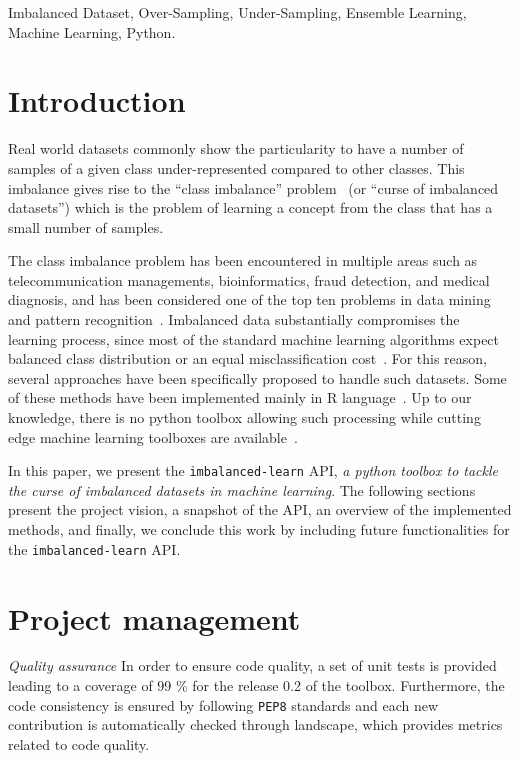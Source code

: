 \documentclass[twoside,11pt]{article}
\begin{document}
\begin{keywords}
  Imbalanced Dataset, Over-Sampling, Under-Sampling, Ensemble Learning, Machine Learning, Python.
\end{keywords}

\section{Introduction}

Real world datasets commonly show the particularity to have a number of samples of a given class under-represented compared to other classes.
This imbalance gives rise to the ``class imbalance'' problem~\citep{prati2009data} (or ``curse of imbalanced datasets'')
which is the problem of learning a concept from the class that has a small number of samples.

The class imbalance problem has been encountered in multiple areas such as
telecommunication managements, bioinformatics, fraud detection, and medical diagnosis,
and has been considered one of the top ten problems in data mining and
pattern recognition~\citep{yang200610,rastgoo2016tackling}.
Imbalanced data substantially compromises the learning process, since most of the
standard machine learning algorithms expect balanced class distribution or an
equal misclassification cost~\citep{he2009learning}. For this reason, several
approaches have been specifically proposed to handle such datasets.
Some of these methods have been implemented mainly in R language~\citep{torgo2010data,kuhn2015caret,dal2013racing}.
Up to our knowledge, there is no python toolbox allowing such processing while cutting edge machine learning toolboxes are available~\citep{pedregosa2011scikit,sonnenburg2010shogun}.

In this paper, we present the \texttt{imbalanced-learn} API,
\textit{a python toolbox to tackle the curse of imbalanced datasets
  in machine learning}. The following sections present the project vision, a snapshot of the API, an overview of the implemented methods,
and finally, we conclude this work by including future functionalities
for the \texttt{imbalanced-learn} API.

\section{Project management}

\noindent\textit{Quality assurance} In order to ensure code quality, a set of unit tests is provided leading to a coverage of 99 \% for the release 0.2 of the toolbox.
Furthermore, the code consistency is ensured by following \texttt{PEP8} standards and each new contribution is automatically checked through landscape, which provides metrics related to code quality.
\end{document}
